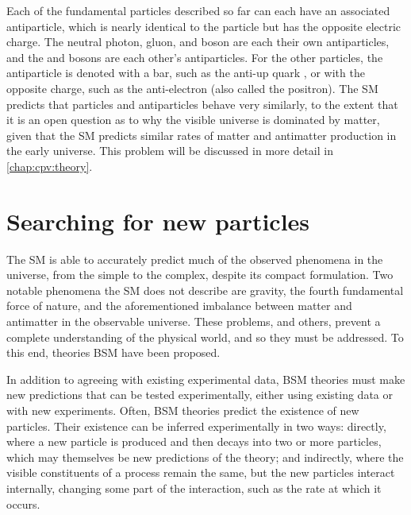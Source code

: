 Each of the fundamental particles described so far can each have an associated 
antiparticle, which is nearly identical to the particle but has the opposite 
electric charge.
The neutral photon, gluon, and \PZ boson are each their own antiparticles, and 
the \PWp and \PWm bosons are each other's antiparticles.
For the other particles, the antiparticle is denoted with a bar, such as the 
anti-up quark \APup, or with the opposite charge, such as the anti-electron 
\APelectron (also called the positron).
The \ac{SM} predicts that particles and antiparticles behave very similarly, to 
the extent that it is an open question as to why the visible universe is 
dominated by matter, given that the \ac{SM} predicts similar rates of matter 
and antimatter production in the early universe.
This problem will be discussed in more detail in \cref{chap:cpv:theory}.

\section{Searching for new particles}

The \acl{SM} is able to accurately predict much of the observed phenomena in 
the universe, from the simple to the complex, despite its compact formulation.
Two notable phenomena the \ac{SM} does not describe are gravity, the fourth 
fundamental force of nature, and the aforementioned imbalance between matter 
and antimatter in the observable universe.
These problems, and others, prevent a complete understanding of the physical 
world, and so they must be addressed.
To this end, theories \acl{BSM} have been proposed.

In addition to agreeing with existing experimental data, \ac{BSM} theories must 
make new predictions that can be tested experimentally, either using existing 
data or with new experiments.
Often, \ac{BSM} theories predict the existence of new particles.
Their existence can be inferred experimentally in two ways: directly, where a 
new particle is produced and then decays into two or more particles, which may 
themselves be new predictions of the theory; and indirectly, where the visible 
constituents of a process remain the same, but the new particles interact 
internally, changing some part of the interaction, such as the rate at which it 
occurs.

